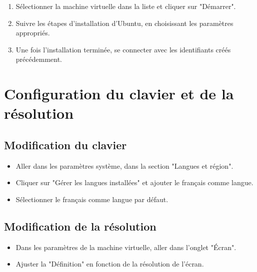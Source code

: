 \begin{enumerate}
    \item Sélectionner la machine virtuelle dans la liste et cliquer sur "Démarrer".
    \item Suivre les étapes d'installation d'Ubuntu, en choisissant les paramètres appropriés.
    \item Une fois l'installation terminée, se connecter avec les identifiants créés précédemment.
\end{enumerate}

\section{Configuration du clavier et de la résolution}

\subsection*{Modification du clavier}

\begin{itemize}
    \item Aller dans les paramètres système, dans la section "Langues et région".
    \item Cliquer sur "Gérer les langues installées" et ajouter le français comme langue.
    \item Sélectionner le français comme langue par défaut.
\end{itemize}

\subsection*{Modification de la résolution}

\begin{itemize}
    \item Dans les paramètres de la machine virtuelle, aller dans l'onglet "Écran".
    \item Ajuster la "Définition" en fonction de la résolution de l'écran.
\end{itemize}